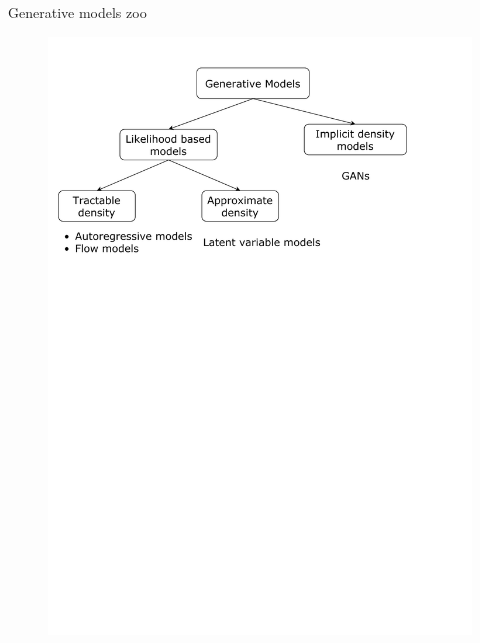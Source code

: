 \begin{frame}{Generative models zoo}
	\begin{figure}
		\centering
		\includegraphics[width=1.0\linewidth]{figs/generative_models_zoo.pdf}
	\end{figure}
\end{frame}
